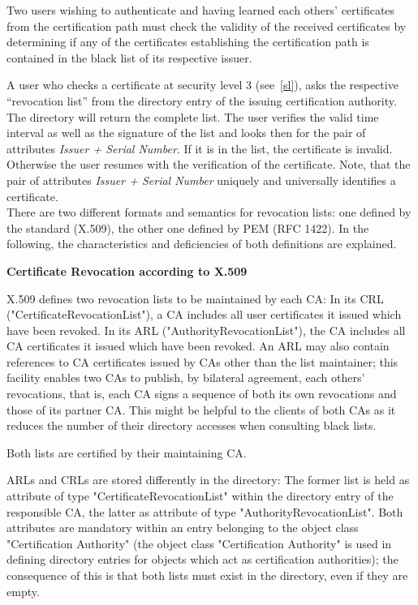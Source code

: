 Two users wishing to authenticate and having learned each others'
certificates from the certification path must check the validity
of the received certificates by determining if any of the
certificates establishing the certification path is contained in the
black list of its respective issuer.

A user who checks a certificate at security level 3 (see~\ref{sl}),
asks the respective ``revocation list'' from the directory entry of the
issuing certification authority.
The directory will return the complete list.
The user verifies the valid time interval as well as
the signature of the list and looks then for
the pair of attributes
{\em Issuer + Serial Number}. If it is in the list,
the certificate is invalid.
Otherwise the user resumes with the verification of the certificate.
Note, that the pair of attributes {\em Issuer + Serial Number}
uniquely and universally identifies a certificate.
\\ [1em]
There are two different formats and semantics for revocation lists:
one defined by the standard (X.509), the other one defined by
PEM (RFC 1422). In the following, the characteristics and deficiencies
of both definitions are explained.

{\bf Certificate Revocation according to X.509}

X.509 defines two revocation lists to be maintained by each CA:
\be
\m In its CRL ("CertificateRevocationList"), a CA includes all user
certificates it issued which have been revoked.
\m In its ARL ("AuthorityRevocationList"), the CA includes all
CA certificates it issued which have been revoked.
\ee
An ARL may
also contain references to CA certificates issued by CAs other
than the list maintainer; this facility enables two CAs to publish,
by bilateral agreement, each others' revocations, that is, each CA
signs a sequence of both its own revocations and those of its
partner CA. This might be helpful to the clients of both CAs as it
reduces the number of their directory accesses when consulting
black lists.

Both lists are certified by their maintaining CA.

ARLs and CRLs are stored differently in the directory: The former list
is held as attribute of type "CertificateRevocationList" within the
directory entry of the responsible CA, the latter as attribute of
type "AuthorityRevocationList". Both attributes are mandatory within
an entry belonging to the object class "Certification Authority"
(the object class "Certification Authority" is used in defining
directory entries for objects which act as certification authorities);
the consequence of this is that both lists must exist in the directory,
even if they are empty.

